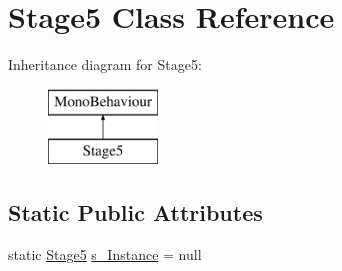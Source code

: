 \hypertarget{class_stage5}{}\section{Stage5 Class Reference}
\label{class_stage5}
Inheritance diagram for Stage5\+:\begin{figure}[H]
\begin{center}
\leavevmode
\includegraphics[height=2.000000cm]{class_stage5}
\end{center}
\end{figure}
\subsection*{Static Public Attributes}
\begin{DoxyCompactItemize}
\item 
static \mbox{\hyperlink{class_stage5}{Stage5}} \mbox{\hyperlink{class_stage5_a11ae41443d21c56ceb47e96d8c2f06a4}{s\+\_\+\+Instance}} = null
\end{DoxyCompactItemize}
